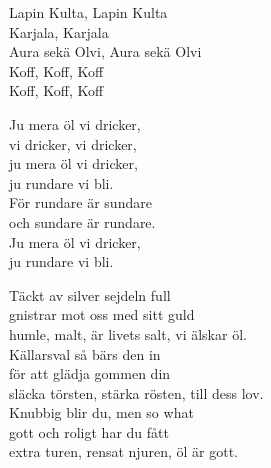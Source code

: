 \documentclass[a6paper, 10pt, twoside]{article}
\begin{document}
\begin{center}
\end{center}
\begin{lyrics}
Lapin Kulta, Lapin Kulta\\
Karjala, Karjala\\
Aura sekä Olvi, Aura sekä Olvi\\
Koff, Koff, Koff\\
Koff, Koff, Koff
\end{lyrics}
\begin{center}
\end{center}
\begin{lyrics}
Ju mera öl vi dricker,\\
vi dricker, vi dricker,\\
ju mera öl vi dricker,\\
ju rundare vi bli.
\vspace{5pt} \\
För rundare är sundare\\
och sundare är rundare.\\
Ju mera öl vi dricker,\\
ju rundare vi bli.
\end{lyrics}
\begin{center}
\end{center}
\begin{lyrics}
Täckt av silver sejdeln full\\
gnistrar mot oss med sitt guld\\
humle, malt, är livets salt, vi älskar öl. 
\vspace{5pt}\\
Källarsval så bärs den in\\
för att glädja gommen din\\
släcka törsten, stärka rösten, till dess lov. 
\vspace{5pt}\\
Knubbig blir du, men so what\\
gott och roligt har du fått\\
extra turen, rensat njuren, öl är gott.
\end{lyrics}
\end{document}
